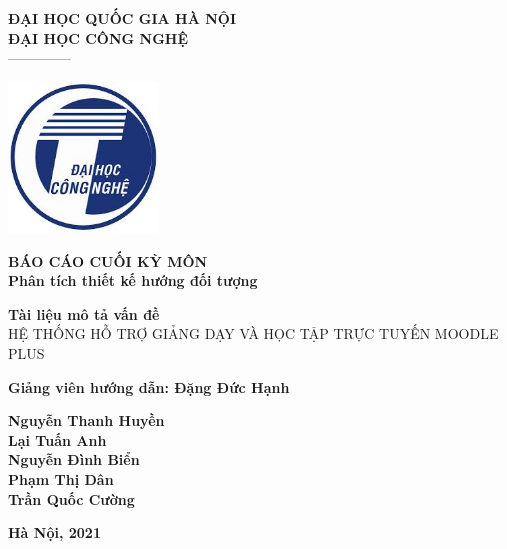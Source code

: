 \documentclass[./main.tex]{subfiles}
\begin{document}
\begin{titlepage}	
	\begin{center}
		\textbf{ĐẠI HỌC QUỐC GIA HÀ NỘI}\\
		\textbf{ĐẠI HỌC CÔNG NGHỆ}\\
		--------------
	
		\vspace*{30pt}
		
		\includegraphics[width=0.3\textwidth]{./images/uet.jpg}
		
		\vspace*{50pt}
		
		\textbf{BÁO CÁO CUỐI KỲ MÔN 
			\\ Phân tích thiết kế hướng đối tượng}
		\vspace*{30pt}
		
		\textbf{Tài liệu mô tả vấn đề\\}
		{\Large HỆ THỐNG HỖ TRỢ GIẢNG DẠY VÀ HỌC TẬP TRỰC TUYẾN MOODLE PLUS}
		
		\vspace*{50pt}
		
		\textbf{Giảng viên hướng dẫn: Đặng Đức Hạnh}
		
		\vspace*{30pt}
		
		\textbf{Nguyễn Thanh Huyền\\
			Lại Tuấn Anh\\
			Nguyễn Đình Biển\\
			Phạm Thị Dân\\
			Trần Quốc Cường\\
		}
		
		\vspace*{40pt}
	\end{center}
	
	
	\begin{center}
		\textbf{Hà Nội, 2021}
	\end{center}
\end{titlepage}
\end{document}
